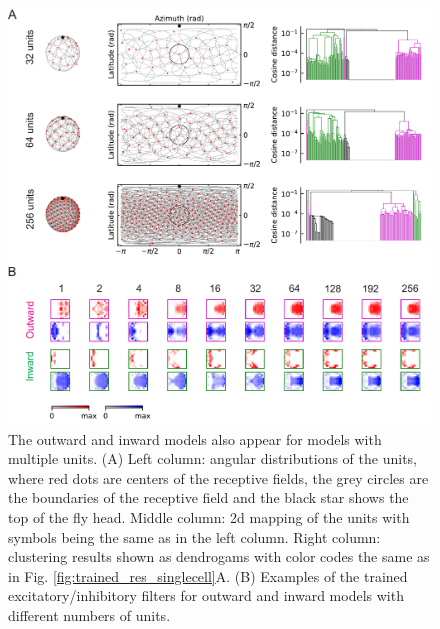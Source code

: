 \documentclass[pdftex,9pt,lineno]{elife}
\begin{document}
\begin{figure}
\includegraphics[width=\linewidth]{figures/trained_results_multicells_paper.pdf}
\caption{The outward and inward models also appear for models with multiple units. (A) Left column: angular distributions of the units, where red dots are centers of the receptive fields, the grey circles are the boundaries of the receptive field and the black star shows the top of the fly head. Middle column: 2d mapping of the units with symbols being the same as in the left column. Right column: clustering results shown as dendrogams with color codes the same as in Fig. \ref{fig:trained_res_singlecell}A. (B) Examples of the trained excitatory/inhibitory filters for outward and inward models with different numbers of units.}
\label{fig:trained_res_multicells}

\end{figure}
\end{document}
